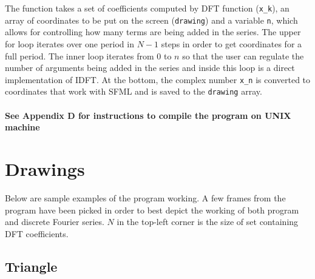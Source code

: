 \documentclass[titlepage]{article}
\begin{document}
    The function takes a set of coefficients computed by DFT function (\texttt{x\_k}),
    an array of coordinates to be put on the screen (\texttt{drawing}) and a variable
    \texttt{n}, which allows for controlling how many terms are being added in the 
    series. The upper for loop iterates over one period in $N-1$ steps in order
    to get coordinates for a full period. The inner loop iterates from $0$ to $n$
    so that the user can regulate the number of arguments being added in the series
    and inside this loop is a direct implementation of IDFT. At the bottom, the 
    complex number \texttt{x\_n} is converted to coordinates that work with SFML 
    and is saved to the \texttt{drawing} array. 
    \paragraph{See Appendix D for instructions to compile the program on UNIX
    machine}

\section{Drawings}

    Below are sample examples of the program working. A few frames from the 
    program have been picked in order to best depict the working of both program
    and discrete Fourier series. $N$ in the top-left corner is the size of set
    containing DFT coefficients.

\subsection{Triangle}
\end{document}
